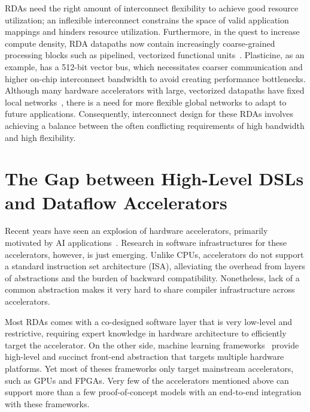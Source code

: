 RDAs need the right amount of interconnect flexibility to achieve good resource utilization; 
an inflexible interconnect constrains the space of
valid application mappings and hinders resource utilization. 
Furthermore, 
in the quest to increase compute density, RDA datapaths now 
contain increasingly coarse-grained processing blocks such as pipelined, vectorized functional 
units~\cite{plasticine, piperench, xilinx-acap}.
Plasticine, as an example, has a 512-bit vector bus, which necessitates coarser communication and higher on-chip interconnect bandwidth to avoid creating performance bottlenecks. 
Although many hardware accelerators with large, vectorized datapaths have fixed local networks~\cite{brainwave}, there is a need for more
flexible global networks to adapt to future applications.
Consequently, interconnect design for these RDAs involves achieving a balance between the often conflicting requirements of high bandwidth and high flexibility.

\section{The Gap between High-Level DSLs and Dataflow Accelerators}

Recent years have seen an explosion of hardware accelerators, primarily motivated by AI
applications~\cite{tangram,truenorth,memristive,dadiannao,pudiannao,chen2017eyeriss,eie,reno,convengine,minerva,dnpu,cbrain}. 
Research in software infrastructures for these accelerators, however, is just emerging.
Unlike CPUs, accelerators do not support a standard instruction set architecture (ISA), alleviating the overhead from
layers of abstractions and the burden of backward compatibility. 
Nonetheless, lack of a common abstraction makes it very hard to share compiler infrastructure
across accelerators. 

Most RDAs comes with a co-designed software layer that is very low-level and restrictive,
requiring expert knowledge in hardware architecture to efficiently target the accelerator.
On the other side,
machine learning frameworks~\cite{tensorflow,caffe,pytorch,taco,onnc,tc} provide high-level and 
succinct front-end abstraction that targets multiple hardware platforms. 
Yet most of theses frameworks only target mainstream accelerators, such as GPUs and FPGAs.
Very few of the accelerators mentioned above can support more than a few proof-of-concept models
with an end-to-end integration with these frameworks.

